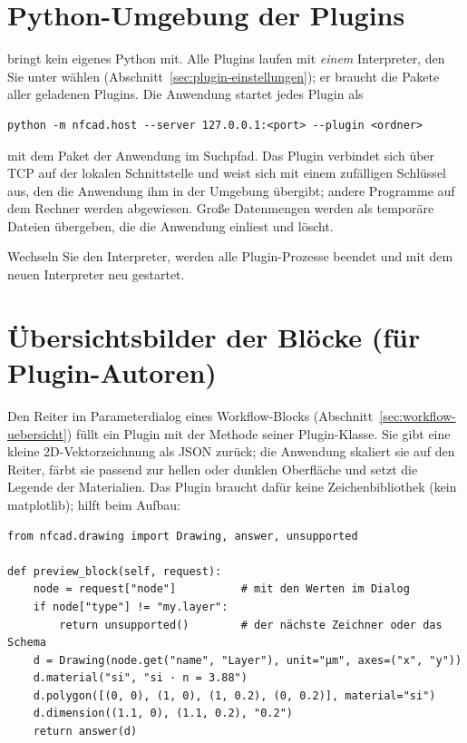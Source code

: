\section{Python-Umgebung der Plugins}\label{sec:verwaltung-python}

\produkt{} bringt kein eigenes Python mit. Alle Plugins laufen mit \emph{einem} Interpreter, den
Sie unter  wählen (Abschnitt~\ref{sec:plugin-einstellungen}); er braucht
die Pakete aller geladenen Plugins. Die Anwendung startet jedes Plugin als

\begin{lstlisting}
python -m nfcad.host --server 127.0.0.1:<port> --plugin <ordner>
\end{lstlisting}

mit dem Paket  der Anwendung im Suchpfad. Das Plugin verbindet sich über TCP auf der
lokalen Schnittstelle und weist sich mit einem zufälligen Schlüssel aus, den die Anwendung ihm in
der Umgebung übergibt; andere Programme auf dem Rechner werden abgewiesen. Große Datenmengen werden
als temporäre Dateien übergeben, die die Anwendung einliest und löscht.

Wechseln Sie den Interpreter, werden alle Plugin-Prozesse beendet und mit dem neuen Interpreter
neu gestartet.

\section{Übersichtsbilder der Blöcke (für Plugin-Autoren)}\label{sec:verwaltung-uebersicht}

Den Reiter  im Parameterdialog eines Workflow-Blocks
(Abschnitt~\ref{sec:workflow-uebersicht}) füllt ein Plugin mit der Methode
 seiner Plugin-Klasse. Sie gibt eine kleine 2D-Vektorzeichnung als
JSON zurück; die Anwendung skaliert sie auf den Reiter, färbt sie passend zur hellen oder dunklen
Oberfläche und setzt die Legende der Materialien. Das Plugin braucht dafür keine
Zeichenbibliothek (kein matplotlib);  hilft beim Aufbau:

\begin{lstlisting}
from nfcad.drawing import Drawing, answer, unsupported

def preview_block(self, request):
    node = request["node"]          # mit den Werten im Dialog
    if node["type"] != "my.layer":
        return unsupported()        # der nächste Zeichner oder das Schema
    d = Drawing(node.get("name", "Layer"), unit="µm", axes=("x", "y"))
    d.material("si", "si · n = 3.88")
    d.polygon([(0, 0), (1, 0), (1, 0.2), (0, 0.2)], material="si")
    d.dimension((1.1, 0), (1.1, 0.2), "0.2")
    return answer(d)
\end{lstlisting}

